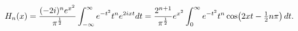 \[\mathop{H_{n}\/}\nolimits\!\left(x\right)=\frac{(-2i)^{n}e^{x^{2}}}{\pi^{\frac%
{1}{2}}}\int_{-\infty}^{\infty}e^{-t^{2}}t^{n}e^{2ixt}dt=\frac{2^{n+1}}{\pi^{%
\frac{1}{2}}}e^{x^{2}}\int_{0}^{\infty}e^{-t^{2}}t^{n}\mathop{\cos\/}\nolimits%
\!\left(2xt-\tfrac{1}{2}n\pi\right)dt.\]